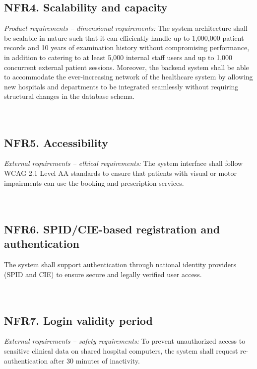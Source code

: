 \documentclass[12pt, a4paper]{article}
\begin{document}
\subsection{NFR4. Scalability and capacity} \label{NFR4}
\textit{Product requirements -- dimensional requirements:}
The system architecture shall be scalable in nature such that it can efficiently handle up to 1,000,000 patient records and 10 years of examination history without compromising performance, in addition to catering to at least 5,000 internal staff users and up to 1,000 concurrent external patient sessions. Moreover, the backend system shall be able to accommodate the ever-increasing network of the healthcare system by allowing new hospitals and departments to be integrated seamlessly without requiring structural changes in the database schema.
\\ 
\\ 
\\ 

\subsection{NFR5. Accessibility} \label{NFR5}
    \textit{External requirements -- ethical requirements:}
    The system interface shall follow WCAG 2.1 Level AA standards to ensure that patients with visual or motor impairments can use the booking and prescription services.
    \\ 
    \\ 
    \\ 
    
\subsection{NFR6. SPID/CIE-based registration and authentication} \label{NFR6}
The system shall support authentication through national identity providers (SPID and CIE) to ensure secure and legally verified user access.
\\ 
\\ 
\\ 

\subsection{NFR7. Login validity period} \label{NFR7}
    \textit{External requirements -- safety requirements:}
    To prevent unauthorized access to sensitive clinical data on shared hospital computers, the system shall request re-authentication after 30 minutes of inactivity.
    \\ 
    \\ 
    \\ 
    
\end{document}
